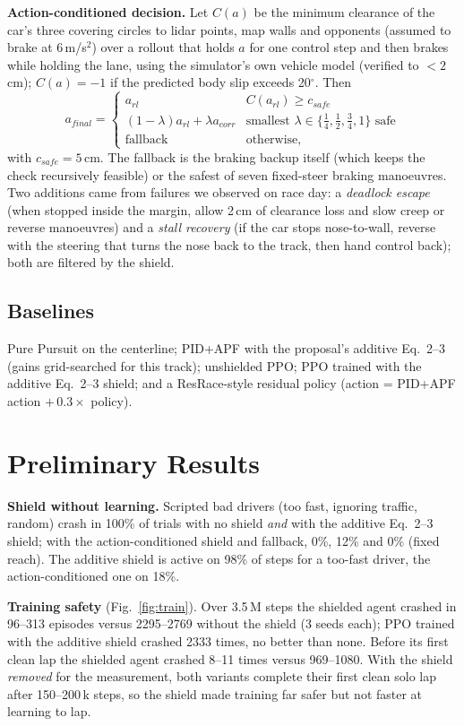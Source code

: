 \documentclass[conference]{IEEEtran}
\begin{document}
\textbf{Action-conditioned decision.} Let $C(a)$ be the minimum clearance of the car's three covering circles to
lidar points, map walls and opponents (assumed to brake at 6\,m/s$^2$) over a rollout that holds $a$ for one
control step and then brakes while holding the lane, using the simulator's own vehicle model (verified to
$<2$\,cm); $C(a) = -1$ if the predicted body slip exceeds 20$^\circ$. Then
\begin{equation}
a_{final} =
\begin{cases}
a_{rl} & C(a_{rl}) \ge c_{safe}\\
(1-\lambda) a_{rl} + \lambda a_{corr} & \text{smallest } \lambda \in \{\tfrac14,\tfrac12,\tfrac34,1\} \text{ safe}\\
\text{fallback} & \text{otherwise,}
\end{cases}
\end{equation}
with $c_{safe} = 5$\,cm. The fallback is the braking backup itself (which keeps the check recursively feasible)
or the safest of seven fixed-steer braking manoeuvres. Two additions came from failures we observed on race day:
a \emph{deadlock escape} (when stopped inside the margin, allow 2\,cm of clearance loss and slow creep or reverse
manoeuvres) and a \emph{stall recovery} (if the car stops nose-to-wall, reverse with the steering that turns the
nose back to the track, then hand control back); both are filtered by the shield.

\subsection{Baselines}
Pure Pursuit on the centerline; PID+APF with the proposal's additive Eq.~2--3 (gains grid-searched for this
track); unshielded PPO; PPO trained with the additive Eq.~2--3 shield; and a ResRace-style residual policy
(action = PID+APF action $+\,0.3\times$ policy).

\section{Preliminary Results}\label{sec:results}
\textbf{Shield without learning.} Scripted bad drivers (too fast, ignoring traffic, random) crash in 100\% of
trials with no shield \emph{and} with the additive Eq.~2--3 shield; with the action-conditioned shield and
fallback, 0\%, 12\% and 0\% (fixed reach). The additive shield is active on 98\% of steps for a too-fast driver,
the action-conditioned one on 18\%.

\textbf{Training safety} (Fig.~\ref{fig:train}). Over 3.5\,M steps the shielded agent crashed in 96--313
episodes versus 2295--2769 without the shield (3 seeds each); PPO trained with the additive shield crashed 2333
times, no better than none. Before its first clean lap the shielded agent crashed 8--11 times versus 969--1080.
With the shield \emph{removed} for the measurement, both variants complete their first clean solo lap after
150--200\,k steps, so the shield made training far safer but not faster at learning to lap.
\end{document}
